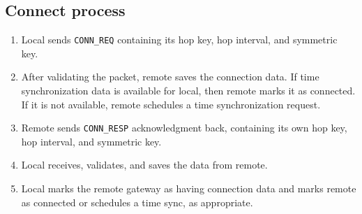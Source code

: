 \subsection{Connect process}
\begin{enumerate}
	\item Local sends \texttt{CONN\_REQ} containing its hop key, hop interval, and symmetric key. 
	\item After validating the packet, remote saves the connection data. If time synchronization data is available for local, then remote marks it as connected. If it is not available, remote schedules a time synchronization request.
	\item Remote sends \texttt{CONN\_RESP} acknowledgment back, containing its own hop key, hop interval, and symmetric key. 
	\item Local receives, validates, and saves the data from remote.
	\item Local marks the remote gateway as having connection data and marks remote as connected or schedules a time sync, as appropriate.
\end{enumerate}

